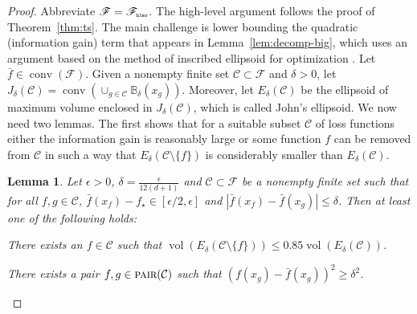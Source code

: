 \documentclass[letter, 12pt]{report}
\newcommand{\pr}{\text{\tiny\texttt{r}}}
\newcommand{\pb}{\text{\tiny\texttt{b}}}
\newcommand{\pl}{\text{\tiny\texttt{l}}}
\renewcommand{\pm}{\text{\tiny\texttt{m}}}
\newcommand{\pair}{\operatorname{\textsc{pair}}}
\newcommand{\ball}{\mathbb{B}}
\newcommand{\cC}{\mathcal C}
\newcommand{\sF}{\mathscr F}
\newcommand{\vol}{\operatorname{vol}}
\newcommand{\conv}{\operatorname{conv}}
\newcommand{\1}{\mathbf{1}}
\theoremstyle{plain}
\newtheorem{lemma}[theorem]{Lemma}
\theoremstyle{definition}
\theoremstyle{remark}
\begin{document}
\begin{proof}
    Abbreviate $\sF = \sF_{\pb\pl\pm\pr}$.
    The high-level argument follows the proof of Theorem~\ref{thm:ts}.
    The main challenge is lower bounding the quadratic (information gain) term that appears in Lemma~\ref{lem:decomp-big},
    which uses an argument based on the method of inscribed ellipsoid for optimization \citep{tarasov1988method}.
    Let $\bar f \in \conv(\sF)$.
    Given a nonempty finite set $\cC \subset \sF$ and $\delta > 0$, let
    $J_\delta(\cC) = \conv\left(\cup_{g \in \cC} \ball_\delta(x_g)\right)$.
    Moreover, let $E_\delta(\cC)$ be the ellipsoid of maximum volume enclosed in $J_\delta(\cC)$, which is called John's ellipsoid.
    We now need two lemmas. The first shows that for a suitable subset $\cC$ of loss functions either the information gain is reasonably large
    or some function $f$ can be removed from $\cC$ in such a way that $E_\delta(\cC \setminus \{f\})$ is considerably smaller than $E_\delta(\cC)$.

    \begin{lemma}\label{lem:ridge-ir-1}
        Let $\epsilon > 0$, $\delta = \frac{\epsilon}{12(d+1)}$ and $\cC \subset \sF$ be a nonempty finite set such that for all $f, g \in \cC$,
        $\bar f(x_f) - f_\star \in [\epsilon/2, \epsilon]$ and
        $|\bar f(x_f) - \bar f(x_g)| \leq \delta$.
        Then at least one of the following holds:
        \begin{enumroman}
            \item There exists an $f \in \cC$ such that $\vol(E_\delta(\cC \setminus \{f\})) \leq 0.85 \vol(E_\delta(\cC))$. \label{lem:ridge-ir-1:a}
            \item There exists a pair $f, g \in \pair(\cC)$ such that $(f(x_g) - \bar f(x_g))^2 \geq \delta^2$. \label{lem:ridge-ir-1:b}
        \end{enumroman}
    \end{lemma}


\end{proof}
\end{document}
